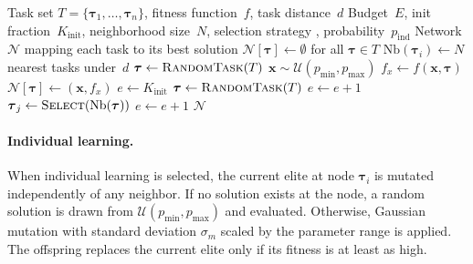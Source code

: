 \documentclass[11pt,a4paper]{article}
\begin{document}
\begin{algorithm}[H]
\caption{MONET}\label{alg:monet}
\begin{algorithmic}[1]
\Require Task set $T=\{\boldsymbol{\tau}_1,\dots,\boldsymbol{\tau}_n\}$,
  fitness function~$f$, task distance~$d$
\Require Budget~$E$, init fraction~$K_{\text{init}}$,
  neighborhood size~$N$, selection strategy ,
  probability~$p_{\text{ind}}$
\Ensure Network $\mathcal{N}$ mapping each task to its best solution
\Statex
\State $\mathcal{N}[\boldsymbol{\tau}] \gets \emptyset$ for all
       $\boldsymbol{\tau} \in T$ 
 
    \State $\mathrm{Nb}(\boldsymbol{\tau}_i) \gets N$ nearest tasks
           under~$d$
\EndFor
\Statex
{}
    \State $\boldsymbol{\tau} \gets \Call{RandomTask}{T}$
    \State $\mathbf{x} \sim \mathcal{U}(p_{\min}, p_{\max})$
    \State $f_x \gets f(\mathbf{x}, \boldsymbol{\tau})$
        \State $\mathcal{N}[\boldsymbol{\tau}] \gets (\mathbf{x}, f_x)$
    \EndIf
\EndFor
\Statex
\State $e \gets K_{\text{init}}$ 
    \State $\boldsymbol{\tau} \gets \Call{RandomTask}{T}$
        \State {}
        \State $e \gets e + 1$
    \Else {}
        \State $\boldsymbol{\tau}_j \gets
               \Call{Select}{\mathrm{Nb}(\boldsymbol{\tau})}$
            \State {}
            \State $e \gets e + 1$
        \EndIf
    \EndIf
\EndWhile
\State \Return $\mathcal{N}$
\end{algorithmic}
\end{algorithm}

\paragraph{Individual learning.}
When individual learning is selected, the current elite at node
$\boldsymbol{\tau}_i$ is mutated independently of any neighbor. If no
solution exists at the node, a random solution is drawn from
$\mathcal{U}(p_{\min}, p_{\max})$ and evaluated. Otherwise, Gaussian
mutation with standard deviation $\sigma_m$ scaled by the parameter
range is applied. The offspring replaces the current elite only if its
fitness is at least as high.
\end{document}
